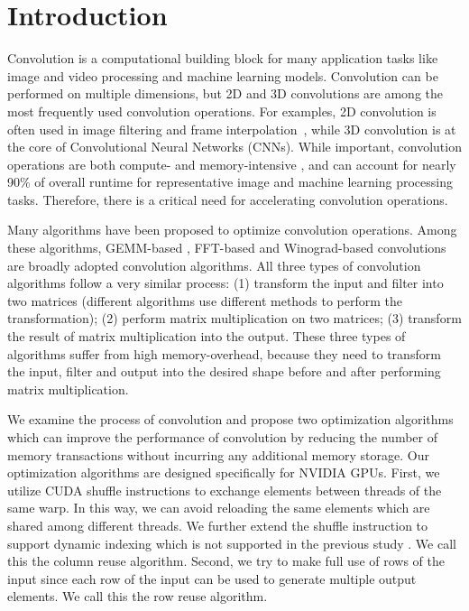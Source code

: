 \section{Introduction}
Convolution is a computational building block for many application tasks like image and video processing and machine learning
models\FIXME{\cite{}}. Convolution can be performed on multiple dimensions, but 2D and 3D convolutions are among the most frequently used
convolution operations. For examples, 2D convolution is often used in image filtering and frame
interpolation~\cite{Perrot2014Fine,Ma2014Optimized,Rudi2015Image,Niklaus2017Video}, while 3D convolution is at the core of Convolutional
Neural Networks (CNNs). While important, convolution operations are both compute- and memory-intensive \cite{cavigelli2015accelerating},
and can account for nearly 90\% of overall runtime \cite{Li2016Performance} for representative image and machine learning processing tasks.
Therefore, there is a critical need for accelerating convolution operations.


 Many algorithms \cite{Iandola2014Communication}
\cite{vasilache2014fast} \cite{lavin2016fast} \cite{cho2017mec} \cite{Zhen2018Optimizing} \cite{Vasudevan2017Parallel}
\cite{Chellapilla2006High} have been proposed to optimize convolution operations. Among these algorithms, GEMM-based
\cite{Vasudevan2017Parallel} \cite{Chellapilla2006High}, FFT-based \cite{vasilache2014fast} and Winograd-based convolutions
\cite{lavin2016fast} are broadly adopted convolution algorithms. All three types of convolution algorithms follow a very similar process:
(1) transform the input and filter into two matrices (different algorithms use different methods to perform the transformation); (2)
perform matrix multiplication on two matrices; (3) transform the result of matrix multiplication into the output. These three types of
algorithms suffer from high memory-overhead, because they need to transform the input, filter and output into the desired shape before and
after performing matrix multiplication.

We examine the process of convolution and propose two optimization algorithms which can improve the performance of convolution by reducing
the number of memory transactions without incurring any additional memory storage. Our optimization algorithms are designed specifically
for NVIDIA GPUs. First, we utilize CUDA shuffle instructions to exchange elements between threads of the same warp. In this way, we can
avoid reloading the same elements which are shared among different threads. We further extend the shuffle instruction to support dynamic
indexing which is not supported in the previous study \cite{vasilache2014fast}. We call this the column reuse algorithm. Second, we try to
make full use of rows of the input since each row of the input can be used to generate multiple output elements. We call this the row reuse
algorithm.

